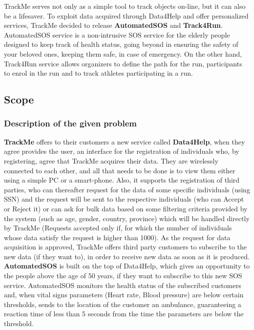 \documentclass[12pt]{article}
\begin{document}
TrackMe serves not only as a simple tool to track objects on-line, but it can also be a lifesaver. To exploit data acquired through Data4Help and offer personalized services, TrackMe decided to release \textbf{AutomatedSOS} and \textbf{Track4Run}. AutomatedSOS service is a non-intrusive SOS service for the elderly people designed to keep track of health status, going beyond in ensuring the safety of your beloved ones, keeping them safe, in case of emergency. On the other hand, Track4Run service allows organizers to define the path for the run, participants to enrol in the run and to track athletes participating in a run.\\

\subsection{Scope}

\subsubsection{Description of the given problem}
\textbf{TrackMe} offers to their customers a new service called \textbf{Data4Help}, when they agree provides the user, an interface for the registration of individuals who, by registering, agree that TrackMe acquires their data. They are wirelessly connected to each other, and all that needs to be done is to view them either using a simple PC or a smart-phone. Also, it supports the registration of third parties, who can thereafter request for the data of some specific individuals (using SSN) and the request will be sent to the respective individuals (who can Accept or Reject it) or can ask for bulk data based on some filtering criteria provided by the system (such as age, gender, country, province) which will be handled directly by TrackMe (Requests accepted only if, for which the number of individuals whose data satisfy the request is higher than 1000). As the request for data acquisition is approved, TrackMe offers third party customers to subscribe to the new data (if they want to), in order to receive new data as soon as it is produced.\\

\textbf{AutomatedSOS} is built on the top of Data4Help, which gives an opportunity to the people above the age of 50 years, if they want to subscribe to this new SOS service. AutomatedSOS monitors the health status of the subscribed customers and, when vital signs parameters (Heart rate, Blood pressure) are below certain thresholds, sends to the location of the customer an ambulance, guaranteeing a reaction time of less than 5 seconds from the time the parameters	are	below the threshold.\\
\end{document}
